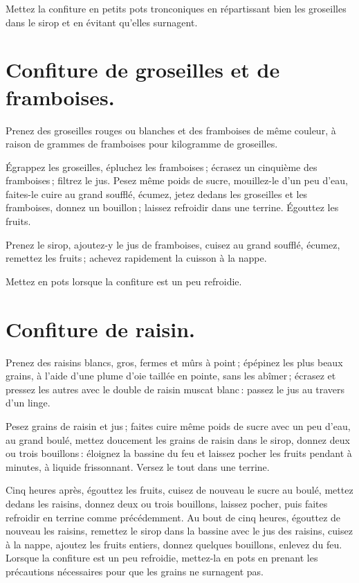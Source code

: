 Mettez la confiture en petits pots tronconiques en répartissant bien les
groseilles dans le sirop et en évitant qu'elles surnagent.

\section*{\centering Confiture de groseilles et de framboises.}
{}

Prenez des groseilles rouges ou blanches et des framboises de même couleur,
à raison de {\mmm} grammes de framboises pour {\mmm} kilogramme de
groseilles.

Égrappez les groseilles, épluchez les framboises ; écrasez un cinquième des
framboises ; filtrez le jus. Pesez même poids de sucre, mouillez-le d'un peu
d'eau, faites-le cuire au grand soufflé, écumez, jetez dedans les groseilles et
les framboises, donnez un bouillon ; laissez refroidir dans une terrine.
Égouttez les fruits.

Prenez le sirop, ajoutez-y le jus de framboises, cuisez au grand soufflé,
écumez, remettez les fruits ; achevez rapidement la cuisson à la nappe.

Mettez en pots lorsque la confiture est un peu refroidie.

\section*{\centering Confiture de raisin.}
{}

Prenez des raisins blancs, gros, fermes et mûrs à point ; épépinez les plus
beaux grains, à l’aide d'une plume d'oie taillée en pointe, sans les abîmer ;
écrasez et pressez les autres avec le double de raisin muscat blanc : passez le
jus au travers d'un linge.

Pesez grains de raisin et jus ; faites cuire même poids de sucre avec un peu
d'eau, au grand boulé, mettez doucement les grains de raisin dans le sirop,
donnez deux ou trois bouillons : éloignez la bassine du feu et laissez pocher
les fruits pendant {\mmm} à {\mmm} minutes, à liquide frissonnant.
Versez le tout dans une terrine.

Cinq heures après, égouttez les fruits, cuisez de nouveau le sucre au boulé,
mettez dedans les raisins, donnez deux ou trois bouillons, laissez pocher, puis
faites refroidir en terrine comme précédemment. Au bout de cinq heures, égouttez
de nouveau les raisins, remettez le sirop dans la bassine avec le jus des raisins,
cuisez à la nappe, ajoutez les fruits entiers, donnez quelques bouillons, enlevez
du feu. Lorsque la confiture est un peu refroidie, mettez-la en pots en prenant les
précautions nécessaires pour que les grains ne surnagent pas.

